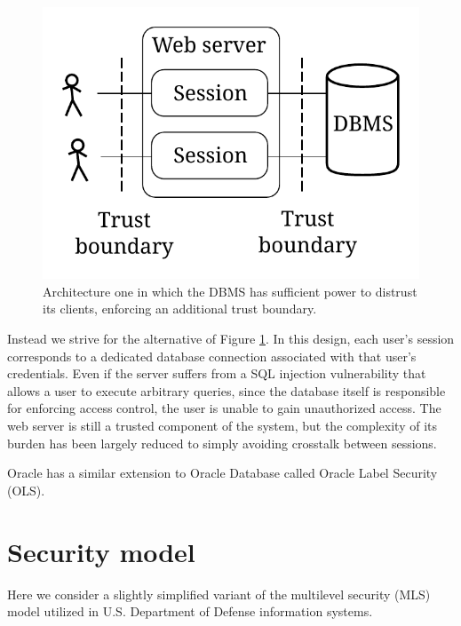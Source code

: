 \documentclass[twocolumn]{article}
\begin{document}
\begin{figure}
  \begin{center}
    \includegraphics[width=0.5\linewidth]{webapp2.pdf}
  \end{center}
  \caption{Architecture one in which the DBMS has sufficient power to distrust its clients, enforcing an additional trust boundary.}
  \label{fig:webapp2}
\end{figure}

Instead we strive for the alternative of Figure \ref{fig:webapp2}. In this design, each user's session corresponds to a dedicated database connection associated with that user's credentials. Even if the server suffers from a SQL injection vulnerability that allows a user to execute arbitrary queries, since the database itself is responsible for enforcing access control, the user is unable to gain unauthorized access. The web server is still a trusted component of the system, but the complexity of its burden has been largely reduced to simply avoiding crosstalk between sessions.

Oracle has a similar extension to Oracle Database called Oracle Label Security (OLS)\cite{ols}.

\section{Security model}

Here we consider a slightly simplified variant of the multilevel security (MLS) model utilized in U.S. Department of Defense information systems.\cite{tcsec}
\end{document}
